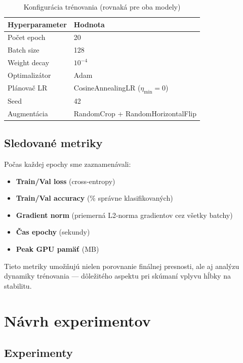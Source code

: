 \documentclass[12pt,a4paper]{article}
\begin{document}
\begin{table}[H]
\centering
\caption{Konfigurácia trénovania (rovnaká pre oba modely)}
\begin{tabular}{ll}
\toprule
\textbf{Hyperparameter} & \textbf{Hodnota} \\
\midrule
Počet epoch       & 20 \\
Batch size        & 128 \\
Weight decay      & $10^{-4}$ \\
Optimalizátor     & Adam \\
Plánovač LR       & CosineAnnealingLR ($\eta_{\min} = 0$) \\
Seed              & 42 \\
Augmentácia       & RandomCrop + RandomHorizontalFlip \\
\bottomrule
\end{tabular}
\end{table}

\subsection{Sledované metriky}

Počas každej epochy sme zaznamenávali:
\begin{itemize}
  \item \textbf{Train/Val loss} (cross-entropy)
  \item \textbf{Train/Val accuracy} (\% správne klasifikovaných)
  \item \textbf{Gradient norm} (priemerná L2-norma gradientov cez všetky batchy)
  \item \textbf{Čas epochy} (sekundy)
  \item \textbf{Peak GPU pamäť} (MB)
\end{itemize}
Tieto metriky umožňujú nielen porovnanie finálnej presnosti, ale aj analýzu dynamiky
trénovania — dôležitého aspektu pri skúmaní vplyvu hĺbky na stabilitu.

\section{Návrh experimentov}

\subsection{Experimenty}
\end{document}
